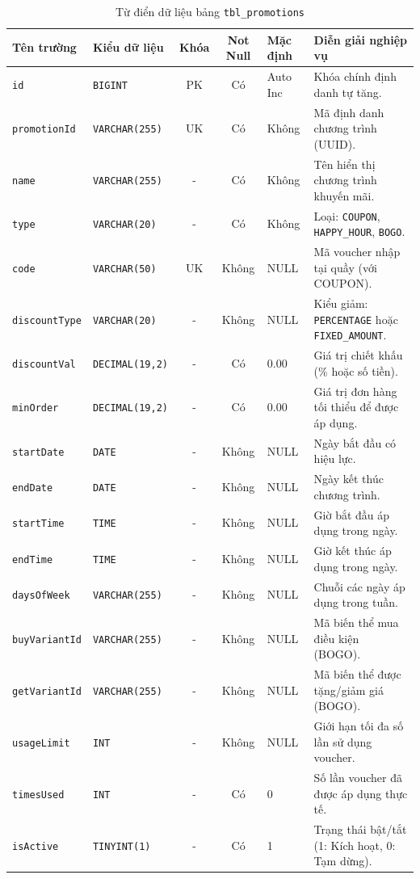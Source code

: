 \begin{table}[htbp]
\centering
\caption{Từ điển dữ liệu bảng \texttt{tbl\_promotions}}
\label{tab:tbl_promotions}
\vspace{2mm}
\begin{tabularx}{\textwidth}{|p{2.5cm}|p{2.8cm}|c|c|p{1.8cm}|X|}
\hline
\textbf{Tên trường} & \textbf{Kiểu dữ liệu} & \textbf{Khóa} & \textbf{Not Null} & \textbf{Mặc định} & \textbf{Diễn giải nghiệp vụ} \\ \hline
\texttt{id} & \texttt{BIGINT} & PK & Có & Auto Inc & Khóa chính định danh tự tăng. \\ \hline
\texttt{promotionId} & \texttt{VARCHAR(255)} & UK & Có & Không & Mã định danh chương trình (UUID). \\ \hline
\texttt{name} & \texttt{VARCHAR(255)} & - & Có & Không & Tên hiển thị chương trình khuyến mãi. \\ \hline
\texttt{type} & \texttt{VARCHAR(20)} & - & Có & Không & Loại: \texttt{COUPON}, \texttt{HAPPY\_HOUR}, \texttt{BOGO}. \\ \hline
\texttt{code} & \texttt{VARCHAR(50)} & UK & Không & NULL & Mã voucher nhập tại quầy (với COUPON). \\ \hline
\texttt{discountType} & \texttt{VARCHAR(20)} & - & Không & NULL & Kiểu giảm: \texttt{PERCENTAGE} hoặc \texttt{FIXED\_AMOUNT}. \\ \hline
\texttt{discountVal} & \texttt{DECIMAL(19,2)} & - & Có & 0.00 & Giá trị chiết khấu (\% hoặc số tiền). \\ \hline
\texttt{minOrder} & \texttt{DECIMAL(19,2)} & - & Có & 0.00 & Giá trị đơn hàng tối thiểu để được áp dụng. \\ \hline
\texttt{startDate} & \texttt{DATE} & - & Không & NULL & Ngày bắt đầu có hiệu lực. \\ \hline
\texttt{endDate} & \texttt{DATE} & - & Không & NULL & Ngày kết thúc chương trình. \\ \hline
\texttt{startTime} & \texttt{TIME} & - & Không & NULL & Giờ bắt đầu áp dụng trong ngày. \\ \hline
\texttt{endTime} & \texttt{TIME} & - & Không & NULL & Giờ kết thúc áp dụng trong ngày. \\ \hline
\texttt{daysOfWeek} & \texttt{VARCHAR(255)} & - & Không & NULL & Chuỗi các ngày áp dụng trong tuần. \\ \hline
\texttt{buyVariantId} & \texttt{VARCHAR(255)} & - & Không & NULL & Mã biến thể mua điều kiện (BOGO). \\ \hline
\texttt{getVariantId} & \texttt{VARCHAR(255)} & - & Không & NULL & Mã biến thể được tặng/giảm giá (BOGO). \\ \hline
\texttt{usageLimit} & \texttt{INT} & - & Không & NULL & Giới hạn tối đa số lần sử dụng voucher. \\ \hline
\texttt{timesUsed} & \texttt{INT} & - & Có & 0 & Số lần voucher đã được áp dụng thực tế. \\ \hline
\texttt{isActive} & \texttt{TINYINT(1)} & - & Có & 1 & Trạng thái bật/tắt (1: Kích hoạt, 0: Tạm dừng). \\ \hline
\end{tabularx}
\end{table}

